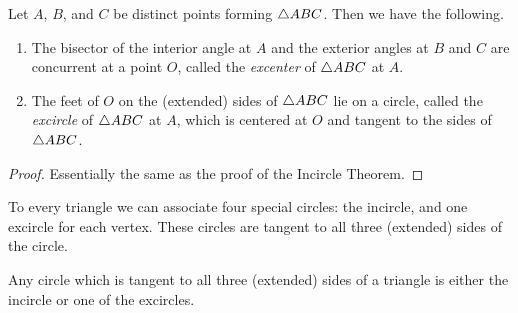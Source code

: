 \begin{construct}
Let $A$, $B$, and $C$ be distinct points forming $\bigtriangleup{ABC}$. Then we have the following.
\begin{enumerate}
\item The bisector of the interior angle at $A$ and the exterior angles at $B$ and $C$ are concurrent at a point $O$, called the \emph{excenter} of $\bigtriangleup{ABC}$ at $A$.

\item The feet of $O$ on the (extended) sides of $\bigtriangleup{ABC}$ lie on a circle, called the \emph{excircle} of $\bigtriangleup{ABC}$ at $A$, which is centered at $O$ and tangent to the sides of $\bigtriangleup{ABC}$.
\end{enumerate}
\end{construct}

\begin{proof}
Essentially the same as the proof of the Incircle Theorem.
\end{proof}

To every triangle we can associate four special circles: the incircle, and one excircle for each vertex. These circles are tangent to all three (extended) sides of the circle.

\begin{prop}
Any circle which is tangent to all three (extended) sides of a triangle is either the incircle or one of the excircles.
\end{prop}
